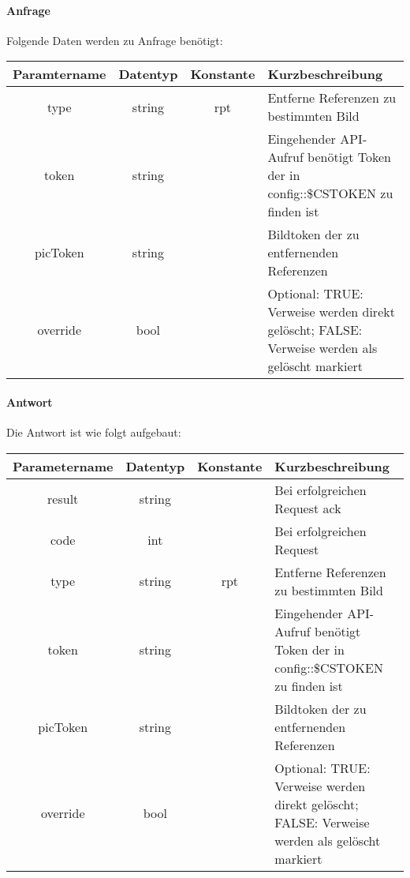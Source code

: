 \paragraph{Anfrage}Folgende Daten werden zu Anfrage benötigt:
\begin{table}[H]
	\begin{tabular}{|c|c|c|p{6.5cm}|}
		\hline
		\textbf{Paramtername} & \textbf{Datentyp} & \textbf{Konstante} & \textbf{Kurzbeschreibung}                                                                                               \\ \hline
		type                & string            & rpt                & Entferne Referenzen zu bestimmten Bild \\ \hline
		token               & string            &                    & Eingehender API-Aufruf benötigt Token der in config::\$CSTOKEN zu finden ist \\ \hline
		picToken            & string            &                    & Bildtoken der zu entfernenden Referenzen \\ \hline
		override			& bool              &                    & Optional: TRUE: Verweise werden direkt gelöscht; FALSE: Verweise werden als gelöscht markiert\\ \hline   
	\end{tabular}
\end{table}
\paragraph{Antwort}Die Antwort ist wie folgt aufgebaut:
\begin{table}[H]
	\begin{tabular}{|c|c|c|p{6.5cm}|}
		\hline
		\textbf{Parametername} & \textbf{Datentyp} & \textbf{Konstante} & \textbf{Kurzbeschreibung}                                                                                               \\ \hline
		result              & string            &                    & Bei erfolgreichen Request {\glqq ack\grqq}                                                                            \\ \hline
		code                & int               &                    & Bei erfolgreichen Request {\glqq 0\grqq} \\ \hline
		type                & string            & rpt                & Entferne Referenzen zu bestimmten Bild \\ \hline
		token               & string            &                    & Eingehender API-Aufruf benötigt Token der in config::\$CSTOKEN zu finden ist \\ \hline
		picToken            & string            &                    & Bildtoken der zu entfernenden Referenzen \\ \hline   
		override			& bool              &                    & Optional: TRUE: Verweise werden direkt gelöscht; FALSE: Verweise werden als gelöscht markiert\\ \hline   
	\end{tabular}
\end{table}
